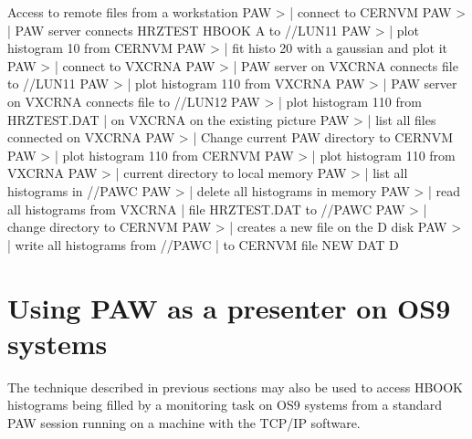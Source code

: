 \begin{XMPt}{Access to remote files from a workstation}
PAW >                          | connect to CERNVM
PAW >              | PAW server connects HRZTEST HBOOK A to //LUN11
PAW >                          | plot histogram 10 from CERNVM
PAW >                         | fit histo 20 with a gaussian and plot it
PAW >                          | connect to VXCRNA
PAW >   | PAW server on VXCRNA connects file to //LUN11
PAW >                         | plot histogram 110 from VXCRNA
PAW >                | PAW server on VXCRNA connects file to //LUN12
PAW >                       | plot histogram 110 from HRZTEST.DAT
                                            | on VXCRNA on the existing picture
PAW >                           | list all files connected on VXCRNA
PAW >                          | Change current PAW directory to CERNVM
PAW >                         | plot histogram 110 from CERNVM
PAW >                | plot histogram 110 from VXCRNA
PAW >                            | current directory to local memory
PAW >                             | list all histograms in //PAWC
PAW >                         | delete all histograms in memory
PAW >                        | read all histograms from VXCRNA
                                            | file HRZTEST.DAT to //PAWC
PAW >                          | change directory to CERNVM
PAW >           | creates a new file on the D disk
PAW >                                | write all histograms from //PAWC
                                            | to CERNVM file NEW DAT D
\end{XMPt}
 
\newpage%

\section{Using PAW as a presenter on OS9 systems}
\label{sec:pawos9}
 
The technique described in previous sections may also be used
to access HBOOK histograms being filled by a monitoring task
on OS9 systems from a standard PAW session running
on a machine with the TCP/IP software.
 
